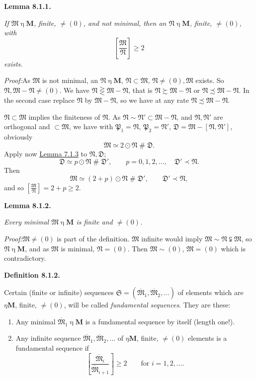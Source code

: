 \documentclass[12pt,b5paper,twoside]{article}
\newcommand{\M}{\mathbf M}
\newcommand{\reldiv}[2]{\left[\frac{#1}{#2}\right]}
\newcommand{\Definition}[1]{%
  \par\smallskip\noindent\phantomsection\label{def:#1}\textbf{Definition #1.}\enspace
}
\newcommand{\Lemma}[1]{%
  \par\smallskip\noindent\phantomsection\label{lem:#1}\textbf{Lemma #1.}\enspace
}
\newcommand{\Proof}{\par\noindent\textit{Proof:}\enspace}
\newcommand{\lemref}[1]{\hyperref[lem:#1]{Lemma #1}}
\begin{document}
\Lemma{8.1.1}
{\itshape
If $\mathfrak M\mathbin\eta\M$, finite, $\ne(0)$, and not minimal, then an
$\mathfrak N\mathbin\eta\M$, finite, $\ne(0)$, with
\[
 \reldiv{\mathfrak M}{\mathfrak N}\geq2
\]
exists.}

\Proof As $\mathfrak M$ is not minimal, an $\mathfrak N\mathbin\eta\M$,
$\mathfrak N\subset\mathfrak M$, $\mathfrak N\ne(0),\mathfrak M$ exists. So
$\mathfrak N,\mathfrak M-\mathfrak N\ne(0)$. We have
$\mathfrak N\gtreqless\mathfrak M-\mathfrak N$, that is
$\mathfrak N\succsim\mathfrak M-\mathfrak N$ or
$\mathfrak N\precsim\mathfrak M-\mathfrak N$. In the second case replace
$\mathfrak N$ by $\mathfrak M-\mathfrak N$, so we have at any rate
$\mathfrak N\precsim\mathfrak M-\mathfrak N$.

$\mathfrak N\subset\mathfrak M$ implies the finiteness of $\mathfrak N$. As
$\mathfrak N\sim\mathfrak N'\subset\mathfrak M-\mathfrak N$, and
$\mathfrak N,\mathfrak N'$ are orthogonal and $\subset\mathfrak M$, we have
with $\mathfrak P_1=\mathfrak N$, $\mathfrak P_2=\mathfrak N'$,
$\mathfrak D=\mathfrak M-[\mathfrak N,\mathfrak N']$, obviously
\[
 \mathfrak M\simeq2\odot\mathfrak N\mathbin{\#}\mathfrak D.
\]
Apply now \lemref{7.1.3} to $\mathfrak N,\mathfrak D$;
\[
 \mathfrak D\simeq p\odot\mathfrak N\mathbin{\#}\mathfrak D',
 \qquad p=0,1,2,\ldots,\quad \mathfrak D'\prec\mathfrak N.
\]
Then
\[
 \mathfrak M\simeq(2+p)\odot\mathfrak N\mathbin{\#}\mathfrak D',
 \qquad \mathfrak D'\prec\mathfrak N,
\]
and so $\reldiv{\mathfrak M}{\mathfrak N}=2+p\geq2$.

\Lemma{8.1.2}
{\itshape
Every minimal $\mathfrak M\mathbin\eta\M$ is finite and $\ne(0)$.}

\Proof $\mathfrak M\ne(0)$ is part of the definition. $\mathfrak M$ infinite
would imply $\mathfrak M\sim\mathfrak N\subsetneqq\mathfrak M$,
so $\mathfrak N\mathbin\eta\M$, and as $\mathfrak M$ is minimal,
$\mathfrak N=(0)$. Then $\mathfrak M\sim(0)$, $\mathfrak M=(0)$ which is
contradictory.

\Definition{8.1.2}
Certain (finite or infinite) sequences
$\mathfrak S=(\overline{\mathfrak M}_1,\overline{\mathfrak M}_2,\ldots)$ of
elements which are $\mathbin\eta\M$, finite, $\ne(0)$, will be called
\emph{fundamental sequences}. They are these:
\begin{enumerate}[leftmargin=2.4em]
\item[$(\alpha)$] Any minimal $\overline{\mathfrak M}_1\mathbin\eta\M$ is a fundamental
  sequence by itself (length one!).
\item[$(\beta)$] Any infinite sequence
  $\overline{\mathfrak M}_1,\overline{\mathfrak M}_2,\ldots$ of
  $\mathbin\eta\M$, finite, $\ne(0)$ elements is a fundamental sequence if
  \[
   \reldiv{\overline{\mathfrak M}_i}{\overline{\mathfrak M}_{i+1}}\geq2
   \qquad\text{for }i=1,2,\ldots.
  \]
\end{enumerate}
\end{document}
